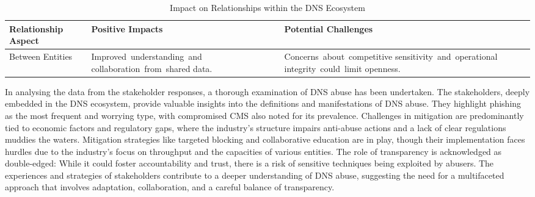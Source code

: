 {

\begin{table}[H]
\centering
\footnotesize 
\begin{tabular}{|l|p{4cm}|p{4cm}|}
\hline
\textbf{Relationship Aspect} & \textbf{Positive Impacts} & \textbf{Potential Challenges} \\
\hline
Between Entities & \mbox {Improved understanding and} \mbox {collaboration from shared} data. & \mbox {Concerns about competitive} \mbox {sensitivity and operational} \mbox {integrity could limit} openness. \\
\hline
\end{tabular}
\caption{Impact on Relationships within the DNS Ecosystem}
\label{table:impact_on_relationships}
\end{table}
}

In analysing the data from the stakeholder responses, a thorough examination of DNS abuse has been undertaken. The stakeholders, deeply embedded in the DNS ecosystem, provide valuable insights into the definitions and manifestations of DNS abuse. They highlight phishing as the most frequent and worrying type, with compromised CMS also noted for its prevalence. Challenges in mitigation are predominantly tied to economic factors and regulatory gaps, where the industry's structure impairs anti-abuse actions and a lack of clear regulations muddies the waters. Mitigation strategies like targeted blocking and collaborative education are in play, though their implementation faces hurdles due to the industry's focus on throughput and the capacities of various entities. The role of transparency is acknowledged as double-edged: While it could foster accountability and trust, there is a risk of sensitive techniques being exploited by abusers. The experiences and strategies of stakeholders contribute to a deeper understanding of DNS abuse, suggesting the need for a multifaceted approach that involves adaptation, collaboration, and a careful balance of transparency.

